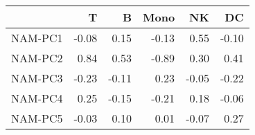 \begin{tabular}{lrrrrr}
\toprule
{} &     T &     B &  Mono &    NK &    DC \\
\midrule
NAM-PC1 & -0.08 &  0.15 & -0.13 &  0.55 & -0.10 \\
NAM-PC2 &  0.84 &  0.53 & -0.89 &  0.30 &  0.41 \\
NAM-PC3 & -0.23 & -0.11 &  0.23 & -0.05 & -0.22 \\
NAM-PC4 &  0.25 & -0.15 & -0.21 &  0.18 & -0.06 \\
NAM-PC5 & -0.03 &  0.10 &  0.01 & -0.07 &  0.27 \\
\bottomrule
\end{tabular}
